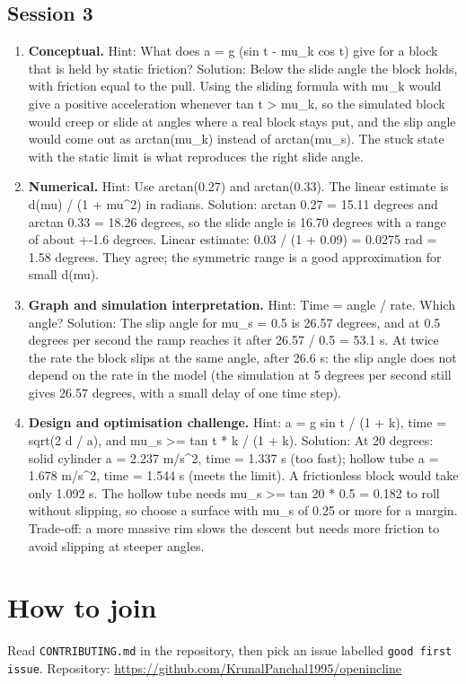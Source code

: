 \documentclass[11pt,a4paper]{article}
\begin{document}
\subsection*{Session 3}
\begin{enumerate}[nosep]
\item \textbf{Conceptual.} Hint: What does a = g (sin t - mu\_k cos t) give for a block that is held by static friction? Solution: Below the slide angle the block holds, with friction equal to the pull. Using the sliding formula with mu\_k would give a positive acceleration whenever tan t \textgreater{} mu\_k, so the simulated block would creep or slide at angles where a real block stays put, and the slip angle would come out as arctan(mu\_k) instead of arctan(mu\_s). The stuck state with the static limit is what reproduces the right slide angle.
\item \textbf{Numerical.} Hint: Use arctan(0.27) and arctan(0.33). The linear estimate is d(mu) / (1 + mu\textasciicircum{}2) in radians. Solution: arctan 0.27 = 15.11 degrees and arctan 0.33 = 18.26 degrees, so the slide angle is 16.70 degrees with a range of about +-1.6 degrees. Linear estimate: 0.03 / (1 + 0.09) = 0.0275 rad = 1.58 degrees. They agree; the symmetric range is a good approximation for small d(mu).
\item \textbf{Graph and simulation interpretation.} Hint: Time = angle / rate. Which angle? Solution: The slip angle for mu\_s = 0.5 is 26.57 degrees, and at 0.5 degrees per second the ramp reaches it after 26.57 / 0.5 = 53.1 s. At twice the rate the block slips at the same angle, after 26.6 s: the slip angle does not depend on the rate in the model (the simulation at 5 degrees per second still gives 26.57 degrees, with a small delay of one time step).
\item \textbf{Design and optimisation challenge.} Hint: a = g sin t / (1 + k), time = sqrt(2 d / a), and mu\_s \textgreater{}= tan t * k / (1 + k). Solution: At 20 degrees: solid cylinder a = 2.237 m/s\textasciicircum{}2, time = 1.337 s (too fast); hollow tube a = 1.678 m/s\textasciicircum{}2, time = 1.544 s (meets the limit). A frictionless block would take only 1.092 s. The hollow tube needs mu\_s \textgreater{}= tan 20 * 0.5 = 0.182 to roll without slipping, so choose a surface with mu\_s of 0.25 or more for a margin. Trade-off: a more massive rim slows the descent but needs more friction to avoid slipping at steeper angles.
\end{enumerate}

\section{How to join}
Read \texttt{CONTRIBUTING.md} in the repository, then pick an issue labelled \texttt{good first issue}. Repository: \url{https://github.com/KrunalPanchal1995/openincline}
\end{document}
